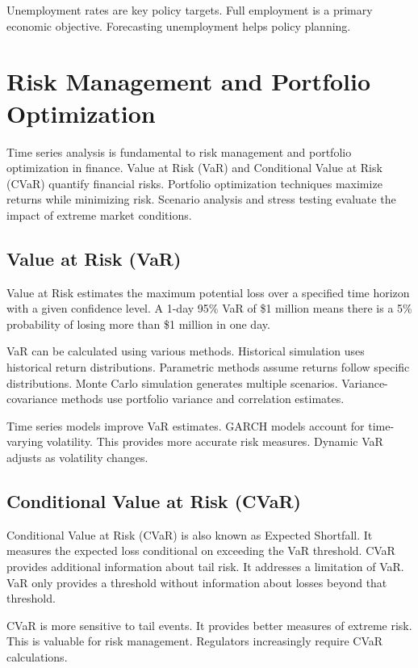Unemployment rates are key policy targets. Full employment is a primary economic objective. Forecasting unemployment helps policy planning.

\section{Risk Management and Portfolio Optimization}

Time series analysis is fundamental to risk management and portfolio optimization in finance. Value at Risk (VaR) and Conditional Value at Risk (CVaR) quantify financial risks. Portfolio optimization techniques maximize returns while minimizing risk. Scenario analysis and stress testing evaluate the impact of extreme market conditions.

\subsection{Value at Risk (VaR)}

Value at Risk estimates the maximum potential loss over a specified time horizon with a given confidence level. A 1-day 95\% VaR of \$1 million means there is a 5\% probability of losing more than \$1 million in one day.

VaR can be calculated using various methods. Historical simulation uses historical return distributions. Parametric methods assume returns follow specific distributions. Monte Carlo simulation generates multiple scenarios. Variance-covariance methods use portfolio variance and correlation estimates.

Time series models improve VaR estimates. GARCH models account for time-varying volatility. This provides more accurate risk measures. Dynamic VaR adjusts as volatility changes.

\subsection{Conditional Value at Risk (CVaR)}

Conditional Value at Risk (CVaR) is also known as Expected Shortfall. It measures the expected loss conditional on exceeding the VaR threshold. CVaR provides additional information about tail risk. It addresses a limitation of VaR. VaR only provides a threshold without information about losses beyond that threshold.

CVaR is more sensitive to tail events. It provides better measures of extreme risk. This is valuable for risk management. Regulators increasingly require CVaR calculations.

